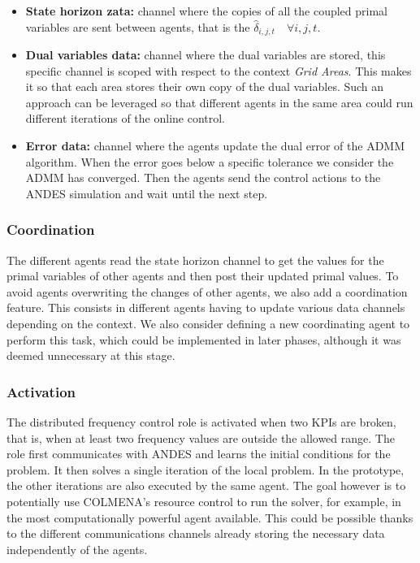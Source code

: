 \documentclass{article}
\begin{document}
\begin{itemize}
    \item \textbf{State horizon zata:} channel where the copies of all the coupled primal variables are sent between agents, that is the $\hat{\delta}_{i,j,t} \quad \forall i,j,t$.
    \item \textbf{Dual variables data:} channel where the dual variables are stored, this specific channel is scoped with respect to the context \textit{Grid Areas}. This makes it so that each area stores their own copy of the dual variables. Such an approach can be leveraged so that different agents in the same area could run different iterations of the online control.
    \item \textbf{Error data:} channel where the agents update the dual error of the ADMM algorithm. When the error goes below a specific tolerance we consider the ADMM has converged. Then the agents send the control actions to the ANDES simulation and wait until the next step.
\end{itemize}

\subsubsection*{Coordination}

The different agents read the state horizon channel to get the values for the primal variables of other agents and then post their updated primal values. To avoid agents overwriting the changes of other agents, we also add a coordination feature. This consists in different agents having to update various data channels depending on the context. We also consider defining a new coordinating agent to perform this task, which could be implemented in later phases, although it was deemed unnecessary at this stage.

\subsubsection*{Activation}

The distributed frequency control role is activated when two KPIs are broken, that is, when at least two frequency values are outside the allowed range. The role first communicates with ANDES and learns the initial conditions for the problem. It then solves a single iteration of the local problem. In the prototype, the other iterations are also executed by the same agent. The goal however is to potentially use COLMENA's resource control to run the solver, for example, in the most computationally powerful agent available. This could be possible thanks to the different communications channels already storing the necessary data independently of the agents.
\end{document}
